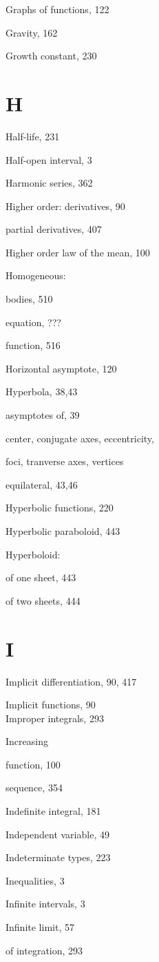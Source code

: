 \documentclass[10pt]{article}
\begin{document}
Graphs of functions, 122

Gravity, 162

Growth constant, 230

\section*{H}
Half-life, 231

Half-open interval, 3

Harmonic series, 362

Higher order: derivatives, 90

partial derivatives, 407

Higher order law of the mean, 100

Homogeneous:

bodies, 510

equation, ???

function, 516

Horizontal asymptote, 120

Hyperbola, 38,43

asymptotes of, 39

center, conjugate axes, eccentricity,

foci, tranverse axes, vertices

equilateral, 43,46

Hyperbolic functions, 220

Hyperbolic paraboloid, 443

Hyperboloid:

of one sheet, 443

of two sheets, 444

\section*{I}
Implicit differentiation, 90, 417

Implicit functions, 90\\
Improper integrals, 293

Increasing

function, 100

sequence, 354

Indefinite integral, 181

Independent variable, 49

Indeterminate types, 223

Inequalities, 3

Infinite intervals, 3

Infinite limit, 57

of integration, 293
\end{document}
